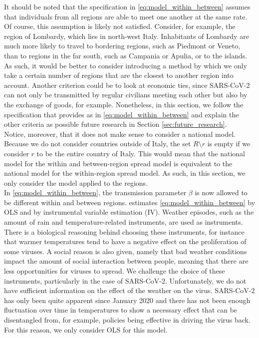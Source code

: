 \documentclass[12pt]{article}
\begin{document}
	It should be noted that the specification in \eqref{eq:model_within_between} assumes that individuals from all regions are able to meet one another at the same rate. Of course, this assumption is likely not satisfied. Consider, for example, the region of Lombardy, which lies in north-west Italy. Inhabitants of Lombardy are much more likely to travel to bordering regions, such as Piedmont or Veneto, than to regions in the far south, such as Campania or Apulia, or to the islands. As such, it would be better to consider introducing a method by which we only take a certain number of regions that are the closest to another region into account. Another criterion could be to look at economic ties, since SARS-CoV-2 can not only be transmitted by regular civilians meeting each other but also by the exchange of goods, for example. Nonetheless, in this section, we follow the specification that \textcite{adda2016economic} provides as in \eqref{eq:model_within_between} and explain the other criteria as possible future research in Section \ref{sec:future_research}. \\
	
	Notice, moreover, that it does not make sense to consider a national model. Because we do not consider countries outside of Italy, the set $R \setminus r$ is empty if we consider $r$ to be the entire country of Italy. This would mean that the national model for the within and between-region spread model is equivalent to the national model for the within-region spread model. As such, in this section, we only consider the model applied to the regions. \\
	
	In \eqref{eq:model_within_between}, the transmission parameter $\beta$ is now allowed to be different within and between regions. \textcite{adda2016economic} estimates \eqref{eq:model_within_between} by OLS and by instrumental variable estimation (IV). Weather episodes, such as the amount of rain and temperature-related instruments, are used as instruments. There is a biological reasoning behind choosing these instruments, for instance that warmer temperatures tend to have a negative effect on the proliferation of some viruses. A social reason is also given, namely that bad weather conditions impact the amount of social interaction between people, meaning that there are less opportunities for viruses to spread. We challenge the choice of these instruments, particularly in the case of SARS-CoV-2. Unfortunately, we do not have sufficient information on the effect of the weather on the virus. SARS-CoV-2 has only been quite apparent since January 2020 and there has not been enough fluctuation over time in temperatures to show a necessary effect that can be disentangled from, for example, policies being effective in driving the virus back. For this reason, we only consider OLS for this model. \\
	
\end{document}
